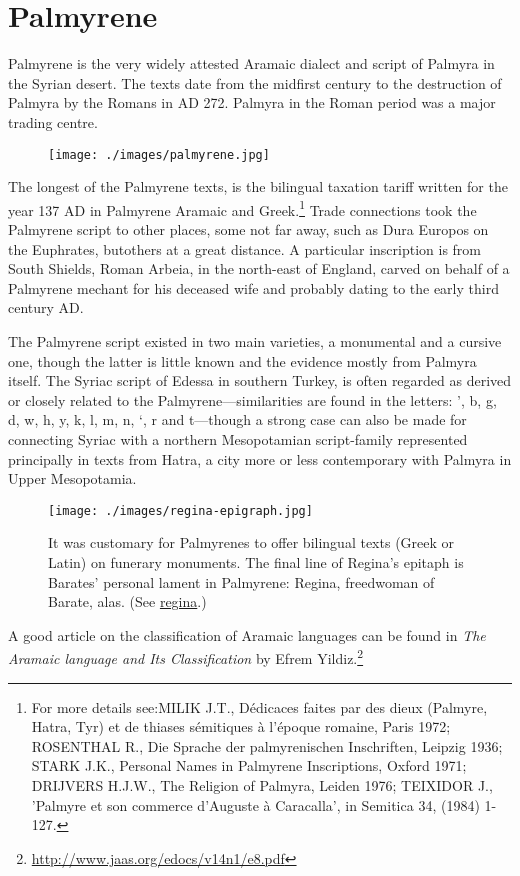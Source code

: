 \newpage
\section{Palmyrene}
\arial

Palmyrene is the very widely attested Aramaic dialect and script
of Palmyra in the Syrian desert. The texts date from the midfirst century to the destruction of Palmyra by the Romans in AD 272. Palmyra in the Roman period was a major trading centre.
\medskip

\begin{figure}[ht]
\centering

\texttt{[image: ./images/palmyrene.jpg]}

\end{figure}

\medskip
The longest of the Palmyrene texts, is the bilingual  taxation tariff written for the year 137 AD in Palmyrene Aramaic and Greek.\footnote{For more details see:MILIK J.T., Dédicaces faites par des dieux (Palmyre, Hatra, 
Tyr) et de thiases sémitiques à l'époque romaine, Paris 1972; ROSENTHAL R., Die 
Sprache der palmyrenischen Inschriften, Leipzig 1936; STARK J.K., Personal Names in 
Palmyrene Inscriptions, Oxford 1971; DRIJVERS H.J.W., The Religion of Palmyra, 
Leiden 1976; TEIXIDOR J., 'Palmyre et son commerce d'Auguste à Caracalla', in 
Semitica 34, (1984) 1-127.  } Trade connections 
took the Palmyrene script to other places, some not far away, such as Dura Europos on the Euphrates, butothers at a great distance. A particular inscription is from South Shields, Roman Arbeia, in the north-east of England, carved on behalf of a Palmyrene mechant for his deceased wife and probably dating to the early third century AD. 

The Palmyrene script existed in two main varieties, a monumental and a cursive one, though the latter is little known and the evidence  mostly from Palmyra itself. The Syriac script of Edessa in southern Turkey, is often regarded as derived or closely related to the Palmyrene---similarities are found in the letters: ', b, g, d, w, h, y, k, l, m, n, `, r and t---though a strong case can also be made for connecting Syriac with a northern Mesopotamian script-family represented principally in texts from Hatra, a city more or less contemporary with Palmyra in Upper Mesopotamia. 


\begin{figure}[ht]
\texttt{[image: ./images/regina-epigraph.jpg]}
\caption{It was customary for Palmyrenes to offer bilingual texts (Greek or Latin) on funerary monuments. The final line of Regina's epitaph is Barates' personal lament in Palmyrene: Regina, freedwoman of Barate, alas. (See \href{http://www2.cnr.edu/home/araia/regina.html}{regina}.)}
\end{figure}

A good article on the classification of Aramaic languages can be found in \textit{The Aramaic language and Its Classification} by Efrem Yildiz.\footnote{\url{http://www.jaas.org/edocs/v14n1/e8.pdf}}




